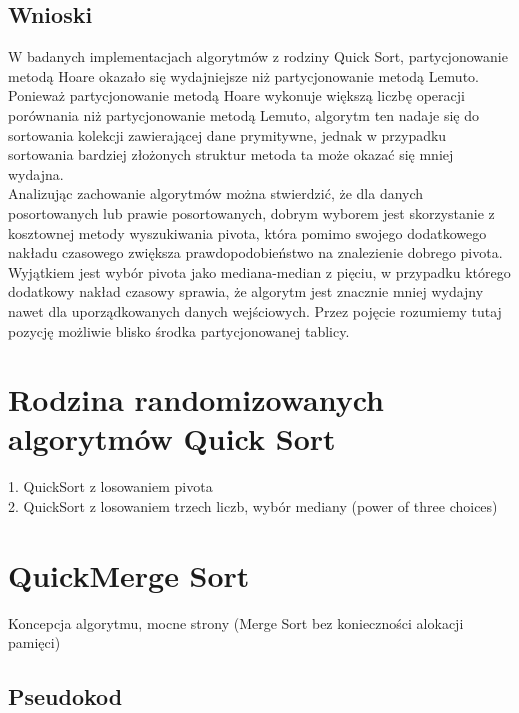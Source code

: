 \subsection{Wnioski}
W badanych implementacjach algorytmów z rodziny Quick Sort, partycjonowanie metodą Hoare okazało się wydajniejsze niż partycjonowanie metodą Lemuto. Ponieważ partycjonowanie metodą Hoare wykonuje większą liczbę operacji porównania niż partycjonowanie metodą Lemuto, algorytm ten nadaje się do sortowania kolekcji zawierającej dane prymitywne, jednak w przypadku sortowania bardziej złożonych struktur metoda ta może okazać się mniej wydajna.\\

Analizując zachowanie algorytmów można stwierdzić, że dla danych posortowanych lub prawie posortowanych, dobrym wyborem jest skorzystanie z kosztownej metody wyszukiwania pivota, która pomimo swojego dodatkowego nakładu czasowego zwiększa prawdopodobieństwo na znalezienie dobrego pivota. Wyjątkiem jest wybór pivota jako mediana-median z pięciu, w przypadku którego dodatkowy nakład czasowy sprawia, że algorytm jest znacznie mniej wydajny nawet dla uporządkowanych danych wejściowych. Przez pojęcie  rozumiemy tutaj pozycję możliwie blisko środka partycjonowanej tablicy.\\

\section{Rodzina randomizowanych algorytmów Quick Sort}


1. QuickSort z losowaniem pivota\\
2. QuickSort z losowaniem trzech liczb, wybór mediany (power of three choices)\\

\section{QuickMerge Sort}
Koncepcja algorytmu, mocne strony (Merge Sort bez konieczności alokacji pamięci)

\subsection{Pseudokod}

